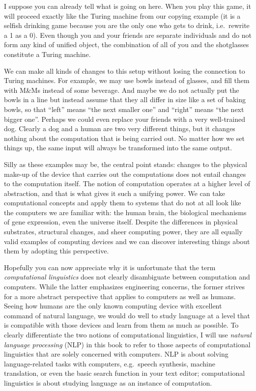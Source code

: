 I suppose you can already tell what is going on here.
When you play this game, it will proceed exactly like the Turing machine from our copying example (it is a selfish drinking game because you are the only one who gets to drink, i.e.~rewrite a 1 as a 0).
Even though you and your friends are separate individuals and do not form any kind of unified object, the combination of all of you and the shotglasses constitute a Turing machine.

We can make all kinds of changes to this setup without losing the connection to Turing machines.
For example, we may use bowls instead of glasses, and fill them with M\&Ms instead of some beverage.
And maybe we do not actually put the bowls in a line but instead assume that they all differ in size like a set of baking bowls, so that ``left'' means ``the next smaller one'' and ``right'' means ``the next bigger one''.
Perhaps we could even replace your friends with a very well-trained dog.
Clearly a dog and a human are two very different things, but it changes nothing about the computation that is being carried out.
No matter how we set things up, the same input will always be transformed into the same output.

Silly as these examples may be, the central point stands: changes to the physical make-up of the device that carries out the computations does not entail changes to the computation itself.
The notion of computation operates at a higher level of abstraction, and that is what gives it such a unifying power.
We can take computational concepts and apply them to systems that do not at all look like the computers we are familiar with: the human brain, the biological mechanisms of gene expression, even the universe itself.
Despite the differences in physical substrates, structural changes, and sheer computing power, they are all equally valid examples of computing devices and we can  discover interesting things about them by adopting this perspective.

Hopefully you can now appreciate why it is unfortunate that the term \emph{computational linguistics} does not clearly disambiguate between computation and computers.
While the latter emphasizes engineering concerns, the former strives for a more abstract perspective that applies to computers as well as humans.
Seeing how humans are the only known computing device with excellent command of natural language, we would do well to study language at a level that is compatible with those devices and learn from them as much as possible.
To clearly differentiate the two notions of computational linguistics, I will use \emph{natural language processing} (NLP) in this book to refer to those aspects of computational linguistics that are solely concerned with computers.
NLP is about solving language-related tasks with computers, e.g.~speech synthesis, machine translation, or even the basic search function in your text editor;
computational linguistics is about studying language as an instance of computation.

